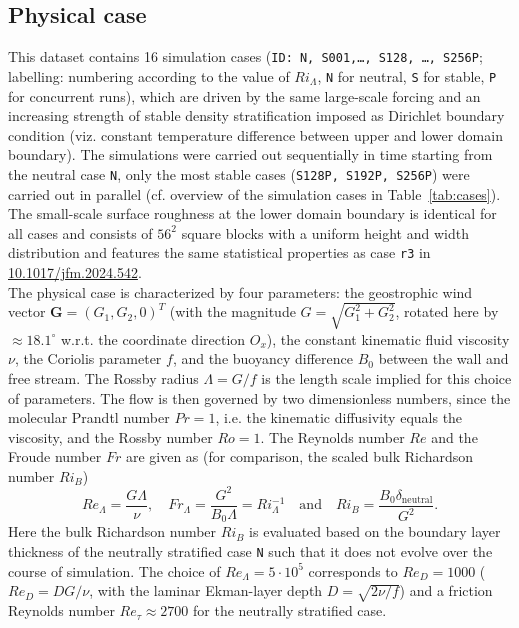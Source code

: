 \documentclass[11pt]{article}
\newcommand{\printdoi}[1]{\href{https://dx.doi.org/#1}{#1}}
\begin{document}
\subsection{Physical case}
This dataset contains 16 simulation cases (\texttt{ID: N, S001,\dots, S128, \dots, S256P}; labelling: numbering according to the value of $Ri_\Lambda$, \texttt{N} for neutral, \texttt{S} for stable, \texttt{P} for concurrent runs), which are driven by the same large-scale forcing and an increasing strength of stable density stratification imposed as Dirichlet boundary condition (viz. constant temperature difference between upper and lower domain boundary). The simulations were carried out sequentially in time starting from the neutral case \texttt{N}, only the most stable cases (\texttt{S128P, S192P, S256P}) were carried out in parallel (cf. overview of the simulation cases in Table~\ref{tab:cases}). 
The small-scale surface roughness at the lower domain boundary is identical for all cases and consists of $56^2$ square blocks with a uniform height and width distribution and features the same statistical properties as case \texttt{r3} in \printdoi{10.1017/jfm.2024.542}.\\
%
The physical case is characterized by four parameters: the geostrophic wind vector \linebreak $\mathbf{G}=\left(G_1,G_2,0\right)^T$ (with the magnitude $G=\sqrt{G_1^2+G_2^2}$, rotated here by $\approx18.1^\circ$ w.r.t. the coordinate direction $O_x$), the constant kinematic fluid viscosity $\nu$, the Coriolis parameter $f$, and the buoyancy difference $B_0$ between the wall and free stream. The Rossby radius $\Lambda=G/f$ is the length scale implied for this choice of parameters. The flow is then governed by two dimensionless numbers, since the molecular Prandtl number $Pr=1$, i.e. the kinematic diffusivity equals the viscosity, and the Rossby number $Ro=1$. The Reynolds number $Re$ and the Froude number $Fr$ are given as (for comparison, the scaled bulk Richardson number $Ri_B$) 
%
\begin{equation}
    Re_\Lambda = \frac{G \Lambda}{\nu},\quad
    Fr_\Lambda=\frac{G^2}{B_0 \Lambda}=Ri_\Lambda^{-1}\quad \mathrm{and} \quad
    Ri_{B} = \frac{B_0 \delta_\mathrm{neutral}}{G^2}.
\end{equation}
%
Here the bulk Richardson number $Ri_B$ is evaluated based on the boundary layer thickness of the neutrally stratified case \texttt{N} such that it does not evolve over the course of simulation. The choice of $Re_\Lambda=5\cdot10^5$ corresponds to $Re_D=1000$ ($Re_D=DG/\nu$, with the laminar Ekman-layer depth $D=\sqrt{2\nu/ f}$) and a friction Reynolds number $Re_{\tau} \approx 2700$ for the neutrally stratified case.  
\end{document}
